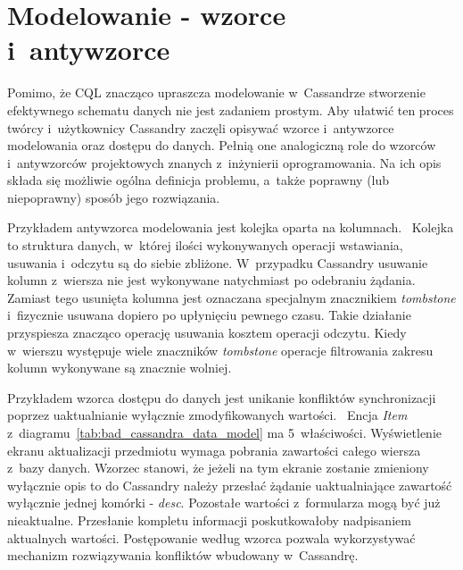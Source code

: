 \section{Modelowanie - wzorce i~antywzorce}
\label{sec:patterns_and_antipatterns}

Pomimo, że CQL znacząco upraszcza modelowanie w~Cassandrze stworzenie efektywnego schematu danych nie jest zadaniem prostym. Aby ułatwić ten proces twórcy i~użytkownicy Cassandry zaczęli opisywać wzorce i~antywzorce modelowania oraz dostępu do danych. Pełnią one analogiczną role do wzorców i~antywzorców projektowych znanych z~inżynierii oprogramowania. Na ich opis składa się możliwie ogólna definicja problemu, a~także poprawny (lub niepoprawny) sposób jego rozwiązania. 

Przykładem antywzorca modelowania jest kolejka oparta na kolumnach.~\cite{cassandra_queue_antipattern} Kolejka to struktura danych, w~której ilości wykonywanych operacji wstawiania, usuwania i~odczytu są do siebie zbliżone. W~przypadku Cassandry usuwanie kolumn z~wiersza nie jest wykonywane natychmiast po odebraniu żądania. Zamiast tego usunięta kolumna jest oznaczana specjalnym znacznikiem \emph{tombstone} i~fizycznie usuwana dopiero po upłynięciu pewnego czasu. Takie działanie przyspiesza znacząco operację usuwania kosztem operacji odczytu. Kiedy w~wierszu występuje wiele znaczników \emph{tombstone} operacje filtrowania zakresu kolumn wykonywane są znacznie wolniej.

Przykładem wzorca dostępu do danych jest unikanie konfliktów synchronizacji poprzez uaktualnianie wyłącznie zmodyfikowanych wartości.~\cite{cassandra_concepts_patterns_antipatterns} Encja \emph{Item} z~diagramu~\ref{tab:bad_cassandra_data_model} ma 5~właściwości. Wyświetlenie ekranu aktualizacji przedmiotu wymaga pobrania zawartości całego wiersza z~bazy danych. Wzorzec stanowi, że jeżeli na tym ekranie zostanie zmieniony wyłącznie opis to do Cassandry należy przesłać żądanie uaktualniające zawartość wyłącznie jednej komórki - \emph{desc}. Pozostałe wartości z~formularza mogą być już nieaktualne. Przesłanie kompletu informacji poskutkowałoby nadpisaniem aktualnych wartości. Postępowanie według wzorca pozwala wykorzystywać mechanizm rozwiązywania konfliktów wbudowany w~Cassandrę.

